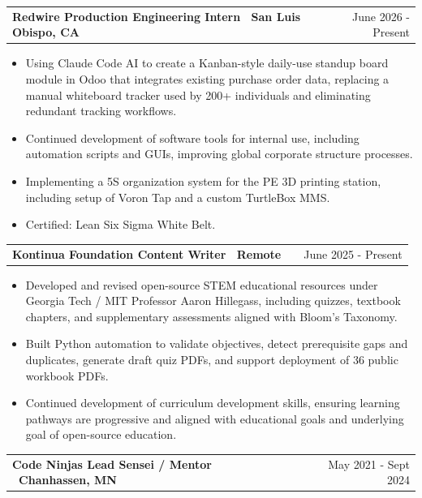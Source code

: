 \documentclass[letterpaper, 11pt]{article}
\makeatletter
\newenvironment{jobshort}[2]
    {
    \begin{tabularx}{\linewidth}{@{}l X r@{}}
    \textbf{#1} & \hfill &  #2 \\[3.75pt]
    \end{tabularx}
    }
    {
    }
\newenvironment{joblong}[2]
    {
    \begin{tabularx}{\linewidth}{@{}l X r@{}}
    \textbf{#1} & \hfill &  #2 \\[3.75pt]
    \end{tabularx}
    \begin{minipage}[t]{\linewidth}
    \begin{itemize}[nosep,after=\strut, leftmargin=1em, itemsep=3pt,label=\small$\bullet$]
    }
    {
    \end{itemize}
    \end{minipage}    
    }
\makeatother
\begin{document}

\begin{joblong}{Redwire Production Engineering Intern \textbullet\ San Luis Obispo, CA}{June 2026 - Present}
\item Using Claude Code AI to create a Kanban-style daily-use standup board module in Odoo that integrates existing purchase order data, replacing a manual whiteboard tracker used by 200+ individuals and eliminating redundant tracking workflows.
\item Continued development of software tools for internal use, including automation scripts and GUIs, improving global corporate structure processes.
\item Implementing a 5S organization system for the PE 3D printing station, including setup of Voron Tap and a custom TurtleBox MMS.
\item Certified: Lean Six Sigma White Belt.
\end{joblong}

\begin{joblong}{Kontinua Foundation Content Writer \textbullet\ Remote}{June 2025 - Present}
\item Developed and revised open-source STEM educational resources under Georgia Tech / MIT Professor Aaron Hillegass, including quizzes, textbook chapters, and supplementary assessments aligned with Bloom's Taxonomy. %
\item Built Python automation to validate objectives, detect prerequisite gaps and duplicates, generate draft quiz PDFs, and support deployment of 36 public workbook PDFs. %
\item Continued development of curriculum development skills, ensuring learning pathways are progressive and aligned with educational goals and underlying goal of open-source education. %
\end{joblong}

\begin{jobshort}{Code Ninjas Lead Sensei / Mentor \textbullet\ Chanhassen, MN}{May 2021 - Sept 2024}
\end{jobshort}
\end{document}
